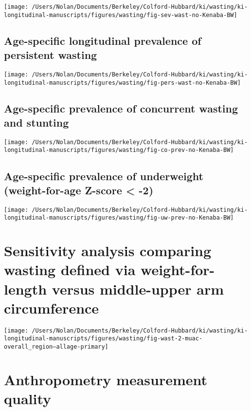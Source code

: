 \documentclass[9pt,]{book}
\begin{document}
\texttt{[image: /Users/Nolan/Documents/Berkeley/Colford-Hubbard/ki/wasting/ki-longitudinal-manuscripts/figures/wasting/fig-sev-wast-no-Kenaba-BW]}

\section{Age-specific longitudinal prevalence of persistent
wasting}\label{age-specific-longitudinal-prevalence-of-persistent-wasting-2}

\texttt{[image: /Users/Nolan/Documents/Berkeley/Colford-Hubbard/ki/wasting/ki-longitudinal-manuscripts/figures/wasting/fig-pers-wast-no-Kenaba-BW]}

\section{Age-specific prevalence of concurrent wasting and
stunting}\label{age-specific-prevalence-of-concurrent-wasting-and-stunting-2}

\texttt{[image: /Users/Nolan/Documents/Berkeley/Colford-Hubbard/ki/wasting/ki-longitudinal-manuscripts/figures/wasting/fig-co-prev-no-Kenaba-BW]}

\section{Age-specific prevalence of underweight (weight-for-age Z-score
\textless{}
-2)}\label{age-specific-prevalence-of-underweight-weight-for-age-z-score--2-1}

\texttt{[image: /Users/Nolan/Documents/Berkeley/Colford-Hubbard/ki/wasting/ki-longitudinal-manuscripts/figures/wasting/fig-uw-prev-no-Kenaba-BW]}

\chapter{Sensitivity analysis comparing wasting defined via
weight-for-length versus middle-upper arm circumference}\label{muac}

\raggedright

\texttt{[image: /Users/Nolan/Documents/Berkeley/Colford-Hubbard/ki/wasting/ki-longitudinal-manuscripts/figures/wasting/fig-wast-2-muac-overall\_region--allage-primary]}

\chapter{Anthropometry measurement quality}\label{anthro}
\end{document}
